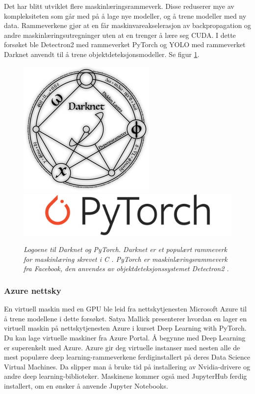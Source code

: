Det har blitt utviklet flere maskinlæringsrammeverk. Disse reduserer mye av kompleksiteten som går med på å lage nye modeller, og å trene modeller med ny data. Rammeverkene gjør at en får maskinvareakselerasjon av backpropagation og andre maskinlæringsutregninger uten at en trenger å lære seg CUDA. I dette forsøket ble Detectron2 med rammeverket PyTorch og YOLO med rammeverket Darknet anvendt til å trene objektdeteksjonsmodeller. Se figur \ref{fig:dl_libs}.

\begin{figure}[t]
\begin{center} 
\includegraphics[scale=0.30]{figures/darknet-logo}
\includegraphics[scale=0.30]{figures/Pytorch_logo}
\caption{\small \sl Logoene til Darknet og PyTorch. Darknet er et populært rammeverk for maskinlæring skrevet i C \cite{Redmon 2016}. PyTorch er maskinlæringsrammeverk fra Facebook, den anvendes av objektdeteksjonssystemet Detectron2 \cite{Wu m.fl. 2020}. \label{fig:dl_libs}}
\end{center} 
\end{figure} 

\subsubsection{Azure nettsky}

En virtuell maskin med en GPU ble leid fra nettskytjenesten Microsoft Azure til å trene modellene i dette forsøket. Satya Mallick presenterer hvordan en lager en virtuell maskin på nettskytjenesten Azure i kurset Deep Learning with PyTorch. Du kan lage virtuelle maskiner fra Azure Portal. Å begynne med Deep Learning er superenkelt med Azure. Azure gir deg virtuelle instanser med nesten alle de mest populære deep learning-rammeverkene ferdiginstallert på deres Data Science Virtual Machines. Da slipper man å bruke tid på installering av Nvidia-drivere og andre deep learning-biblioteker. Maskinene kommer også med JupyterHub ferdig installert, om en ønsker å anvende Jupyter Notebooks. \cite{Mallick m.fl. 2020}

